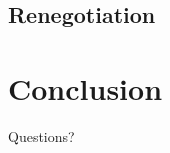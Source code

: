 \documentclass{f4_beamer_metropolis}
\begin{document}
\begin{frame}{}

\end{frame}

\subsection{Renegotiation}

\begin{frame}{}

\end{frame}

\section{Conclusion}

\begin{frame}{}

\end{frame}

\begin{frame}[standout]
  Questions?
\end{frame}
\end{document}
